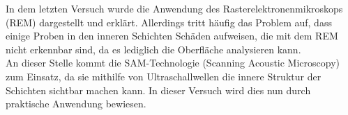 In dem letzten Versuch wurde die Anwendung des Rasterelektronenmikroskops (REM) dargestellt und erklärt. Allerdings tritt häufig das Problem auf, dass einige Proben in den inneren Schichten Schäden aufweisen, die mit dem REM nicht erkennbar sind, da es lediglich die Oberfläche analysieren kann.\\ An dieser Stelle kommt die SAM-Technologie (Scanning Acoustic Microscopy) zum Einsatz, da sie mithilfe von Ultraschallwellen die innere Struktur der Schichten sichtbar machen kann. In dieser Versuch wird dies nun durch praktische Anwendung bewiesen.